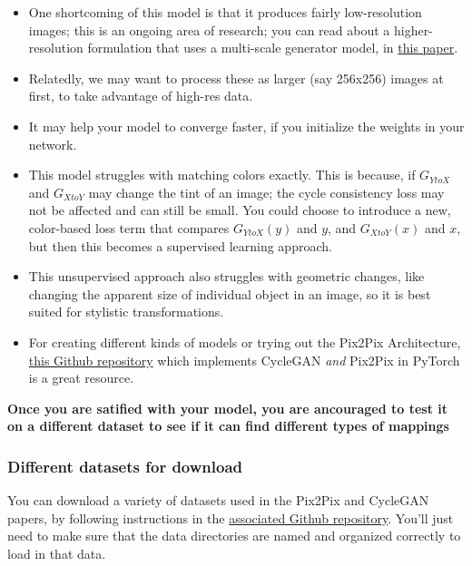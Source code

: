 \begin{itemize}

\item One shortcoming of this model is that it produces fairly
  low-resolution images; this is an ongoing area of research; you can
  read about a higher-resolution formulation that uses a multi-scale
  generator model, in \href{https://arxiv.org/abs/1711.11585}{this
  paper}.
\item Relatedly, we may want to process these as larger (say 256x256) images
  at first, to take advantage of high-res data.
\item It may help your model to converge faster, if you initialize the
  weights in your network.
\item This model struggles with matching colors exactly. This is because, if
  \(G_{YtoX}\) and \(G_{XtoY}\) may change the tint of an image; the
  cycle consistency loss may not be affected and can still be small. You
  could choose to introduce a new, color-based loss term that compares
  \(G_{YtoX}(y)\) and \(y\), and \(G_{XtoY}(x)\) and \(x\), but then
  this becomes a supervised learning approach.
\item This unsupervised approach also struggles with geometric changes, like
  changing the apparent size of individual object in an image, so it is
  best suited for stylistic transformations.
\item For creating different kinds of models or trying out the Pix2Pix
  Architecture,
  \href{https://github.com/junyanz/pytorch-CycleGAN-and-pix2pix/}{this
  Github repository} which implements CycleGAN \emph{and} Pix2Pix in
  PyTorch is a great resource.
\end{itemize}

\textbf{Once you are satified with your model, you are ancouraged to
test it on a different dataset to see if it can find different types of
mappings}

\subsubsection{Different datasets for download}

You can download a variety of datasets used in the Pix2Pix and CycleGAN
papers, by following instructions in the
\href{https://github.com/junyanz/pytorch-CycleGAN-and-pix2pix/blob/master/README.md}{associated
Github repository}. You'll just need to make sure that the data
directories are named and organized correctly to load in that data.
